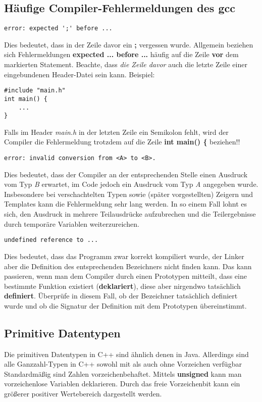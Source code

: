 \documentclass[
  accentcolor=tud1c,	%
  colorbacktitle,		%
  inverttitle,			%
  german,				%
  twoside
]{tudexercise}
\begin{document}
\subsection{Häufige Compiler-Fehlermeldungen des gcc}

\begin{verbatim}
error: expected ';' before ...
\end{verbatim}

Dies bedeutet, dass in der Zeile davor ein \textbf{;} vergessen wurde.
Allgemein beziehen sich Fehlermeldungen \textbf{expected ... before ...} häufig auf die Zeile \textbf{vor} dem markierten Statement.
Beachte, dass \emph{die Zeile davor} auch die letzte Zeile einer eingebundenen Header-Datei sein kann. Beispiel:

\begin{lstlisting}
#include "main.h"
int main() {
	...
}
\end{lstlisting}

Falls im Header \emph{main.h} in der letzten Zeile ein Semikolon fehlt, wird der Compiler die Fehlermeldung trotzdem auf die Zeile \textbf{int main() \{} beziehen!!

\begin{verbatim}
error: invalid conversion from <A> to <B>.
\end{verbatim}

Dies bedeutet, dass der Compiler an der entsprechenden Stelle einen Ausdruck vom Typ \emph{B} erwartet, im Code jedoch ein Ausdruck vom Typ \emph{A} angegeben wurde. Insbesondere bei verschachtelten Typen sowie (später vorgestellten) Zeigern und Templates kann die Fehlermeldung sehr lang werden. In so einem Fall lohnt es sich, den Ausdruck in mehrere Teilausdrücke aufzubrechen und die Teilergebnisse durch temporäre Variablen weiterzureichen.

\begin{verbatim}
undefined reference to ...
\end{verbatim}

Dies bedeutet, dass das Programm zwar korrekt kompiliert wurde, der Linker aber die Definition des entsprechenden Bezeichners nicht finden kann.
Das kann passieren, wenn man dem Compiler durch einen Prototypen mitteilt, dass eine bestimmte Funktion existiert (\textbf{deklariert}), diese aber nirgendwo tatsächlich \textbf{definiert}.
Überprüfe in diesem Fall, ob der Bezeichner tatsächlich definiert wurde und ob die Signatur der Definition mit dem Prototypen übereinstimmt.


\subsection{Primitive Datentypen}
Die primitiven Datentypen in C++ sind ähnlich denen in Java.
Allerdings sind alle Ganzzahl-Typen in C++ sowohl mit als auch ohne Vorzeichen verfügbar
Standardmäßig sind Zahlen vorzeichenbehaftet.
Mittels \textbf{unsigned} kann man vorzeichenlose Variablen deklarieren.
Durch das freie Vorzeichenbit kann ein größerer positiver Wertebereich dargestellt werden.
\end{document}
